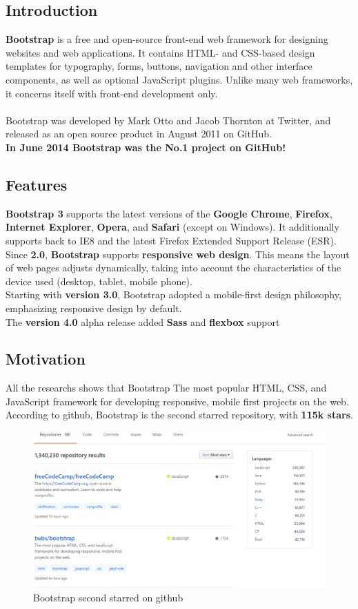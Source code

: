 \documentclass[12pt]{article}
\begin{document}
	\subsection{Introduction}
	\textbf{Bootstrap} is a free and open-source front-end web framework for designing websites and web applications. It contains HTML- and CSS-based design templates for typography, forms, buttons, navigation and other interface components, as well as optional JavaScript plugins. Unlike many web frameworks, it concerns itself with front-end development only.
	\\
	\\
	Bootstrap was developed by Mark Otto and Jacob Thornton at Twitter, and released as an open source product in August 2011 on GitHub.\\
	\textbf{In June 2014 Bootstrap was the No.1 project on GitHub!}
	\subsection{Features}
	\textbf{Bootstrap 3} supports the latest versions of the \textbf{Google Chrome}, \textbf{Firefox}, \textbf{Internet Explorer}, \textbf{Opera}, and \textbf{Safari} (except on Windows). It additionally supports back to IE8 and the latest Firefox Extended Support Release (ESR).
	\\
	Since \textbf{2.0}, \textbf{Bootstrap} supports \textbf{responsive web design}. This means the layout of web pages adjusts dynamically, taking into account the characteristics of the device used (desktop, tablet, mobile phone).
	\\
	Starting with \textbf{version 3.0}, Bootstrap adopted a mobile-first design philosophy, emphasizing responsive design by default.
	\\
	The \textbf{version 4.0} alpha release added \textbf{Sass} and \textbf{flexbox} support
	\subsection{Motivation}
	All the researchs shows that Bootstrap The most popular HTML, CSS, and JavaScript framework for developing responsive, mobile first projects on the web.
	\\
	According to github, Bootstrap is the second starred repository, with \textbf{115k stars}.
		\begin{figure}[h]
		\centering
		\includegraphics[width=1\textwidth]{Boostrap_statics_github.png}
		\caption{Bootstrap second starred on github}
	\end{figure}
\end{document}
